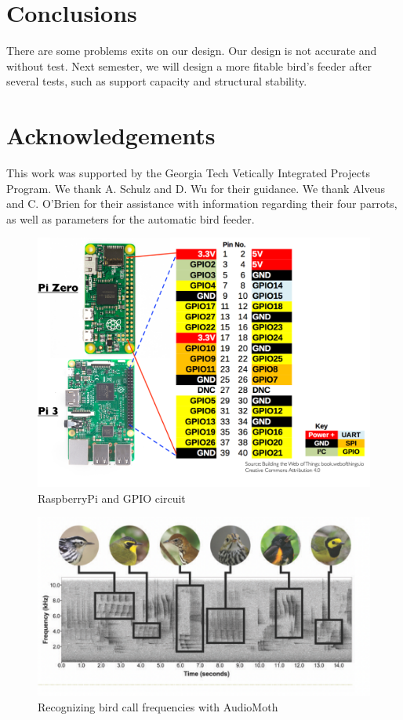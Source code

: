 \documentclass[11pt]{article}
\begin{document}
\section{Conclusions}
There are some problems exits on our design. Our design is not accurate and without test. Next semester, we will design a more fitable bird's feeder after several tests, such as support capacity and structural stability.


\section{Acknowledgements} 
This work was supported by the Georgia Tech Vetically Integrated Projects Program. We thank A. Schulz and D. Wu for their guidance. We thank Alveus and C. O'Brien for their assistance with information regarding their four parrots, as well as parameters for the automatic bird feeder.




\pagebreak

\begin{figure}[htp]
    \centering
    \includegraphics[width=1\textwidth,page=1]{pi}
    \caption{RaspberryPi and GPIO circuit}
    \label{RaspberryPi}
\end{figure}

\begin{figure}[htp]
    \centering
    \includegraphics[width=1\textwidth,page=1]{birdCalls}
    \caption{Recognizing bird call frequencies with AudioMoth}
    \label{BirdCalls}
\end{figure}

\pagebreak
\end{document}
